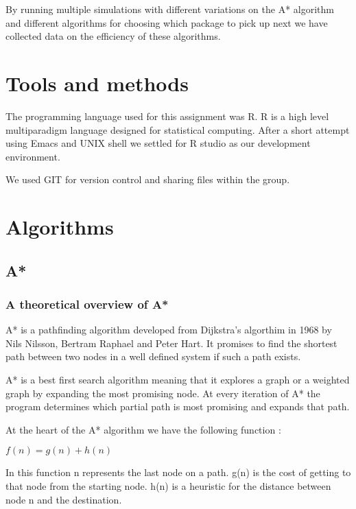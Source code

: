 \documentclass[12pt, a4paper]{article}
\begin{document}
By running multiple simulations with different variations on the A* algorithm and different algorithms for choosing which package to pick up next we have collected data on the efficiency of these algorithms.

\section{Tools and methods}

The programming language used for this assignment was R. R is a high level multiparadigm language designed for statistical computing. After a short attempt using Emacs and UNIX shell we settled for R studio as our development environment. 

We used GIT for version control and sharing files within the group. 

\section{Algorithms}

\subsection{A*}

\subsubsection{A theoretical overview of A*}

A* is a pathfinding algorithm developed from Dijkstra’s algorthim in 1968 by Nils Nilsson, Bertram Raphael and Peter Hart. It promises to find the shortest path between two nodes in a well defined system if such a path exists. 

A* is a best first search algorithm meaning that it explores a graph or a weighted graph by expanding the most promising node. At every iteration of A* the program determines which partial path is most promising and expands that path. 

At the heart of the A* algorithm we have the following function :

\begin{center}
$f(n) = g(n) + h(n)$
\end{center}

In this function n represents the last node on a path. g(n) is the cost of getting to that node from the starting node. h(n) is a heuristic for the distance between node n and the destination. 
\end{document}
